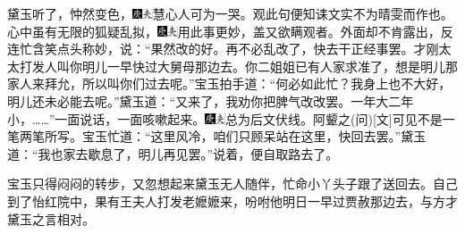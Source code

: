 黛玉听了，忡然变色，{\includegraphics[width=3mm]{../Images/00004}\includegraphics[width=3mm]{../Images/00012}\footnotesize \kaishu 慧心人可为一哭。观此句便知诔文实不为晴雯而作也。}心中虽有无限的狐疑乱拟，{\includegraphics[width=3mm]{../Images/00004}\includegraphics[width=3mm]{../Images/00012}\footnotesize \kaishu 用此事更妙，盖又欲瞒观者。}外面却不肯露出，反连忙含笑点头称妙，说：``果然改的好。再不必乱改了，快去干正经事罢。才刚太太打发人叫你明儿一早快过大舅母那边去。你二姐姐已有人家求准了，想是明儿那家人来拜允，所以叫你们过去呢。''宝玉拍手道：``何必如此忙？我身上也不大好，明儿还未必能去呢。''黛玉道：``又来了，我劝你把脾气改改罢。一年大二年小，\ldots{}\ldots{}''一面说话，一面咳嗽起来。{\includegraphics[width=3mm]{../Images/00004}\includegraphics[width=3mm]{../Images/00012}\footnotesize \kaishu 总为后文伏线。阿颦之{(问)}{[}文{]}可见不是一笔两笔所写。}宝玉忙道：``这里风冷，咱们只顾呆站在这里，快回去罢。''黛玉道：``我也家去歇息了，明儿再见罢。''说着，便自取路去了。

宝玉只得闷闷的转步，又忽想起来黛玉无人随伴，忙命小丫头子跟了送回去。自己到了怡红院中，果有王夫人打发老嬷嬷来，吩咐他明日一早过贾赦那边去，与方才黛玉之言相对。

